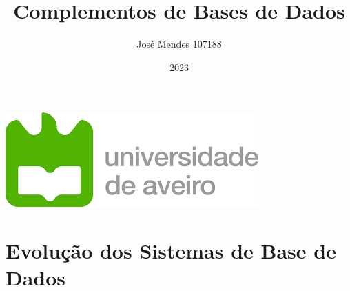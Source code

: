 \documentclass{article}
\title{Complementos de Bases de Dados}
\author{José Mendes 107188}
\date{2023}
\begin{document}
\begin{titlepage}
    \maketitle
    \begin{center}
        \includegraphics[scale=0.4]{UA.png}
    \end{center}
    \thispagestyle{empty} %
\end{titlepage}

\pagebreak

\section{Evolução dos Sistemas de Base de Dados}
\end{document}
